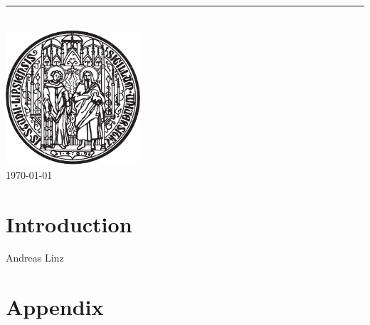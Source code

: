 \documentclass[a4paper]{scrartcl}
\author{\documentAuthor}
\date{\today}
\begin{document}
    \begin{titlepage}
        \begin{center}
            {\Huge
                \textbf{\documentTitle{}}\\
            }
            \vspace{6pt}
            {\Large
            \textit{\documentSubtitle{}}
            }
            \vspace{12pt}
            \hrule
            \vspace{32pt}
            {
            	\Large
            	\textbf{\documentAuthor{}}
            }
            \\
            \vspace{32pt}
            \includegraphics[width=5cm]{resources/siegel_schwarz}
            \\
            \vspace{6pt}
            \sffamily{
            	\Large
            	\university
            }
            \vfill
            \today
        \end{center}
    \end{titlepage}
    \clearpage

    \tableofcontents
    \clearpage

    \section{Introduction}

    Andreas Linz
    \cite{placeholder}

    \clearpage
    \section{Appendix}

    \printglossary[type=main,title={Glossar},toctitle={Glossar}]

    \printbibliography
\end{document}
